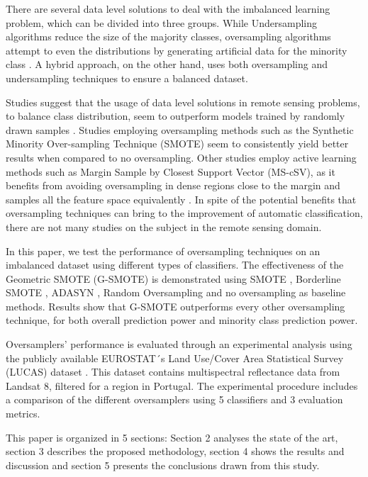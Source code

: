 \documentclass[parskip=full]{scrartcl}
\begin{document}
There are several data level solutions to deal with the imbalanced learning
problem, which can be divided into three groups. While Undersampling algorithms
reduce the size of the majority classes, oversampling algorithms attempt to
even the distributions by generating artificial data for the minority class
\cite{Mellor2015}. A hybrid approach, on the other hand, uses both oversampling
and undersampling techniques to ensure a balanced dataset.

Studies suggest that the usage of data level solutions in remote sensing
problems, to balance class distribution, seem to outperform models
trained by randomly drawn samples \cite{Wang2019, Mellor2015}.  Studies
employing oversampling methods such as the Synthetic Minority Over-sampling
Technique (SMOTE) \cite{Chawla2002} seem to consistently yield better results
\cite{Johnson2013, Geib2015} when compared to no oversampling. Other studies
employ active learning methods such as Margin Sample by Closest Support Vector
(MS-cSV), as it benefits from avoiding oversampling in dense regions close to
the margin and samples all the feature space equivalently \cite{Tuia2009}.
In spite of the potential benefits that oversampling techniques can bring to
the improvement of automatic classification, there are not many studies on the
subject in the remote sensing domain.

In this paper, we test the performance of oversampling techniques on an
imbalanced dataset using different types of classifiers. The effectiveness of
the Geometric SMOTE (G-SMOTE) \cite{Douzas2019} is demonstrated using SMOTE
\cite{Chawla2002}, Borderline SMOTE \cite{Han2005}, ADASYN \cite{HaiboHe2008},
Random Oversampling and no oversampling as baseline methods. Results
show that G-SMOTE outperforms every other oversampling technique, for both
overall prediction power and minority class prediction power.

Oversamplers' performance is evaluated through an experimental analysis using
the publicly available EUROSTAT´s Land Use/Cover Area Statistical Survey
(LUCAS) dataset \cite{LUCAS2015}. This dataset contains multispectral
reflectance data from Landsat 8, filtered for a region in Portugal. The 
experimental procedure includes a comparison of the different oversamplers
using 5 classifiers and 3 evaluation metrics.

This paper is organized in 5 sections: Section 2 analyses the state of the art,
section 3 describes the proposed methodology, section 4 shows the results and
discussion and section 5 presents the conclusions drawn from this study.
\end{document}
